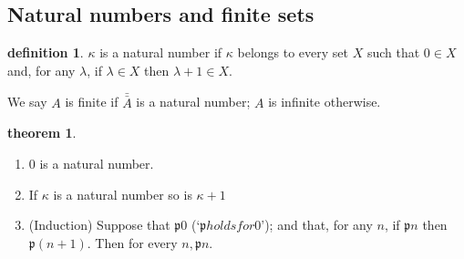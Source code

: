 \documentclass[a4paper,11pt]{article}%
\theoremstyle{remark}
\theoremstyle{definition}
\newtheorem{theorem}{theorem}[section]
\theoremstyle{definition}
\newtheorem*{definition}{definition}
\theoremstyle{plain}
\theoremstyle{definition}
\begin{document}
\subsection{Natural numbers and finite sets}
\begin{definition}
    $\kappa$ is a natural number if $\kappa$ belongs to every set $X$ such that 
    $0\in X$ and, for any $\lambda$, if $\lambda\in X$ then $\lambda+1\in X$.
\end{definition}
We say $A$ is finite if $\bar{\bar{A}}$ is a natural number; $A$ is infinite otherwise.
\begin{theorem}
    \begin{enumerate}
        \item 0 is a natural number.
        \item If $\kappa$ is a natural number so is $\kappa+1$
        \item (Induction) Suppose that $\mathfrak{p}$0 (`$\mathfrak{p} holds for 0$');
        and that, for any $n$, if $\mathfrak{p}n$ then $\mathfrak{p}(n+1)$. Then for every $n,\mathfrak{p}n$.
    \end{enumerate}
\end{theorem}
\end{document}
